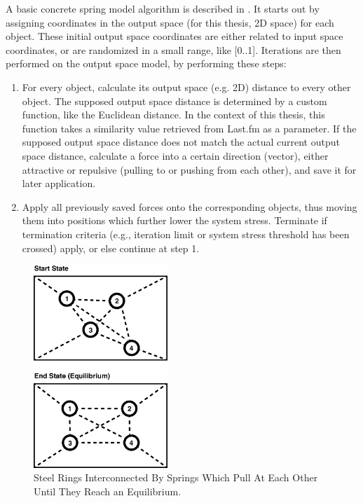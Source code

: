 A basic concrete spring model algorithm is described in \cite{Chalmers:1996:LIT:244979.245035}. It starts out by assigning coordinates in the output space (for this thesis, 2D space) for each object. These initial output space coordinates are either related to input space coordinates, or are randomized in a small range, like [0..1]. Iterations are then performed on the output space model, by performing these steps:

\begin{enumerate}
	\item For every object, calculate its output space (e.g. 2D) distance to every other object. The supposed output space distance is determined by a custom function, like the Euclidean distance. In the context of this thesis, this function takes a similarity value retrieved from Last.fm as a parameter. 
	\subitem If the supposed output space distance does not match the actual current output space distance, calculate a force into a certain direction (vector), either attractive or repulsive (pulling to or pushing from each other), and save it for later application.
	\item Apply all previously saved forces onto the corresponding objects, thus moving them into positions which further lower the system stress. Terminate if termination criteria (e.g., iteration limit or system stress threshold has been crossed) apply, or else continue at step 1. 
\end{enumerate}		

\begin{figure}[H]
  \centering
    \includegraphics[width=0.45\textwidth]{figures/spring_model}
  \caption{Steel Rings Interconnected By Springs Which Pull At Each Other Until They Reach an Equilibrium.}
  \label{fig:spring_model}
\end{figure}


